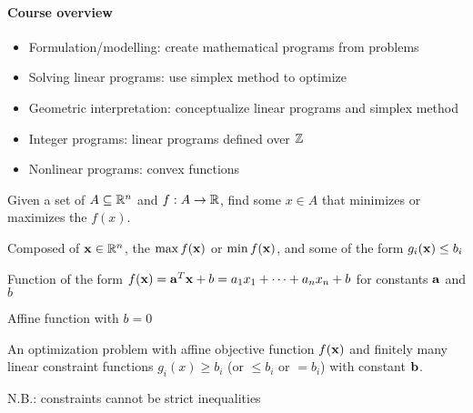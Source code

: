 \documentclass[class=co250,tikz,notes]{agony}
\begin{document}
\paragraph{Course overview}
\begin{itemize}[nosep]
  \item Formulation/modelling: create mathematical programs from problems
  \item Solving linear programs: use simplex method to optimize
  \item Geometric interpretation: conceptualize linear programs and simplex method
  \item Integer programs: linear programs defined over $\mathbb{Z}$
  \item Nonlinear programs: convex functions
\end{itemize}

\begin{defn}
  Given a set of  $A \subseteq \mathbb{R}^n$ and $f : A \to \mathbb{R}$,
  find some $x \in A$ that minimizes or maximizes the  $f(x)$.

  Composed of  $\vb x \in \mathbb{R}^n$,
  the  $\max f(\vb x)$ or $\min f(\vb x)$,
  and some  of the form $g_i(\vb x) \leq b_i$
\end{defn}

\begin{defn}
  Function of the form $f(\vb x) = \vb a^T \vb x + b = a_1x_1 + \dotsb + a_nx_n + b$ for constants $\vb a$ and $b$
\end{defn}

\begin{defn}
  Affine function with $b=0$
\end{defn}

\begin{defn}
  An optimization problem with affine objective function $f(\vb x)$ and finitely many linear constraint functions $g_i(x) \geq b_i$ (or $\leq b_i$ or $= b_i$) with constant $\vb b$.

  N.B.: constraints cannot be strict inequalities
\end{defn}
\end{document}
